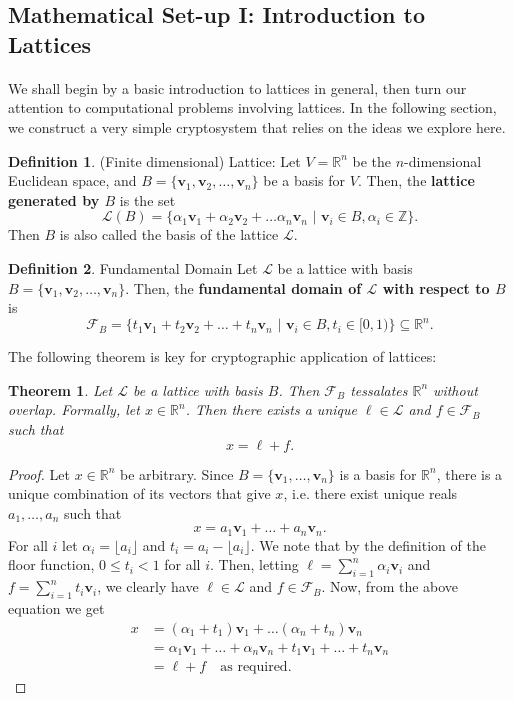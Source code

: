 \documentclass{article}
\newtheorem{theorem}{Theorem}[section]
\theoremstyle{definition}
\newtheorem{definition}{Definition}[section]
\renewcommand{\L}{\mathcal{L}}
\newcommand{\F}{\mathcal{F}}
\newcommand{\Int}{\mathbb{Z}}
\newcommand{\Reals}{\mathbb{R}}
\renewcommand{\vec}[1]{\textbf{#1}}
\begin{document}
\subsection{Mathematical Set-up I: Introduction to Lattices}
\paragraph{} We shall begin by a basic introduction to lattices in general, then
turn our attention to computational problems involving lattices. In the
following section, we construct a very simple cryptosystem that relies on the
ideas we explore here.
\begin{definition}{(Finite dimensional) Lattice:}
  Let $V = \Reals^n$ be the $n$-dimensional Euclidean space, and $B = \{\vec{v}_1,
  \vec{v}_2, \hdots, \vec{v}_n\}$ be a basis for $V$. Then, the \textbf{lattice generated by $B$} is the set
  \[
    \L(B) = \{\alpha_1\vec{v}_1 + \alpha_2\vec{v}_2 + \hdots \alpha_n\vec{v}_n\,\,|\,\, \vec{v}_i \in B,
    \alpha_i \in \Int\}.
  \]
  Then $B$ is also called the basis of the lattice $\L$.
\end{definition}
\begin{definition}{Fundamental Domain}
  Let $\L$ be a lattice with basis $B = \{\vec{v}_1, \vec{v}_2, \hdots, \vec{v}_n\}$. Then, the
  \textbf{fundamental domain of $\L$ with respect to $B$} is
  \[
    \F_B = \{t_1\vec{v}_1 + t_2\vec{v}_2 + \hdots + t_n\vec{v}_n \,\,|\,\, \vec{v}_i \in B, t_i \in [0,
    1)\} \subseteq \Reals^n.
  \]
\end{definition}
The following theorem is key for cryptographic application of lattices:
\begin{theorem}
  Let $\L$ be a lattice with basis $B$. Then $\F_B$ tessalates $\Reals^n$
  without overlap. Formally, let $x \in \Reals^n$. Then there exists a unique $\ell \in \L$
  and $f \in \F_B$ such that
\[
  x = \ell + f.
\]
\end{theorem}
\begin{proof}
  Let $x \in \Reals^n$ be arbitrary. Since $B = \{ \vec{v}_1, \hdots, \vec{v}_n \}$ is a basis for $\Reals^n$, there
  is a unique combination of its vectors that give $x$, i.e. there exist unique
  reals $a_1, \hdots, a_n$ such that
  \[
    x = a_1\vec{v}_1 + \hdots + a_n\vec{v}_n.
  \]
  For all $i$ let $\alpha_i = \lfloor a_i \rfloor$ and $t_i = a_i - \lfloor a_i
  \rfloor$. We note that by the definition of the floor function, $0 \leq t_i <
  1$ for all $i$. Then, letting $\ell = \sum_{i = 1}^n \alpha_i\vec{v}_i$ and $f
  = \sum_{i = 1}^n t_i\vec{v}_i$, we clearly have $\ell \in \L$ and $f \in
  \F_B$. Now, from the above equation we get
  \begin{align*}
    x &= (\alpha_1 + t_1)\vec{v}_1 + \hdots (\alpha_n + t_n)\vec{v}_n \\
      &= \alpha_1\vec{v}_1 + \hdots + \alpha_n\vec{v}_n + t_1\vec{v}_1 + \hdots + t_n\vec{v}_n \\
      &= \ell + f \quad \text{as required.}
  \end{align*}
\end{proof}
\end{document}
